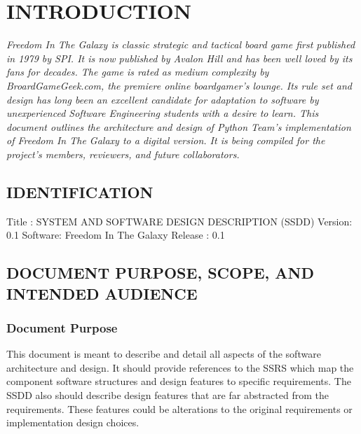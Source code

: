 \documentclass[twoside,letterpaper]{article}
\begin{document}
\bigskip

\bigskip
\clearpage\setcounter{page}{1}\pagestyle{Convertiv}
\section[INTRODUCTION]{\bfseries\color{black}
INTRODUCTION}
{\itshape\color{black}
Freedom In The Galaxy is classic strategic and tactical board game first published in 1979 by SPI. It is now published by Avalon Hill and has been well loved by its fans for decades. The game is rated as medium complexity by BroardGameGeek.com, the premiere online boardgamer's lounge. Its rule set and design has long been an excellent candidate for adaptation to software by unexperienced Software Engineering students with a desire to learn. This document outlines the architecture and design of Python Team's implementation of Freedom In The Galaxy to a digital version. It is being compiled for the project's members, reviewers, and future collaborators.  
}

\subsection{IDENTIFICATION}
{\color{black}
Title : SYSTEM AND SOFTWARE DESIGN DESCRIPTION (SSDD)
\newline
Version: 0.1
\newline
Software: Freedom In The Galaxy
\newline
Release : 0.1
}

\subsection[DOCUMENT PURPOSE, SCOPE, AND INTENDED
AUDIENCE]{\bfseries\color{black} DOCUMENT
PURPOSE, SCOPE, AND INTENDED AUDIENCE}

\subsubsection{Document Purpose}
{\color{black}
This document is meant to describe and detail all aspects of the software architecture and design. It should provide references to the SSRS which map the component software structures and design features to specific requirements. The SSDD also should describe design features that are far abstracted from the requirements. These features could be alterations to the original requirements or implementation design choices.
}
\end{document}

